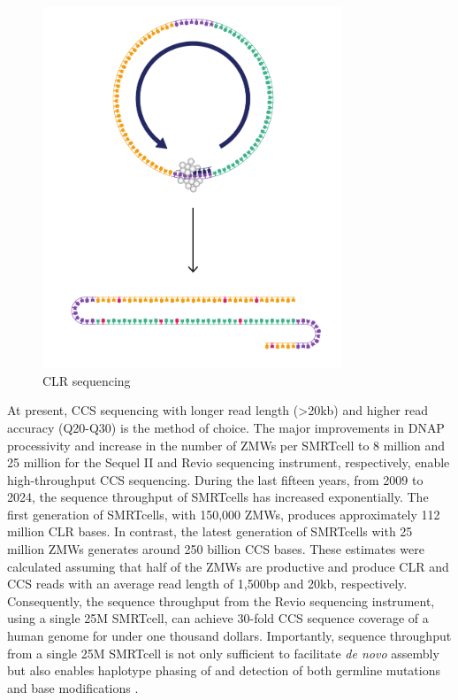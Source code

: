 \begin{figure}[h!]
\caption{CLR sequencing}
\label{figure:clr-sequencing}
\begin{centering}
\includegraphics[width=0.8\textwidth]{Vector/CLR_sequencing.pdf}
\end{centering}
\end{figure}

At present, CCS sequencing with longer read length (>20kb) and higher read accuracy (Q20-Q30) \cite{Wenger2019-pw} is the method of choice. The major improvements in DNAP processivity and increase in the number of ZMWs per SMRTcell to 8 million and 25 million for the Sequel II and Revio sequencing instrument, respectively, enable high-throughput CCS sequencing. During the last fifteen years, from 2009 to 2024, the sequence throughput of SMRTcells has increased exponentially. The first generation of SMRTcells, with 150,000 ZMWs, produces approximately 112 million CLR bases. In contrast, the latest generation of SMRTcells with 25 million ZMWs generates around 250 billion CCS bases. These estimates were calculated assuming that half of the ZMWs are productive and produce CLR and CCS reads with an average read length of 1,500bp and 20kb, respectively. Consequently, the sequence throughput from the Revio sequencing instrument, using a single 25M SMRTcell, can achieve 30-fold CCS sequence coverage of a human genome for under one thousand dollars. Importantly, sequence throughput from a single 25M SMRTcell is not only sufficient to facilitate \textit{de novo} assembly \cite{Nurk2020-gu, Cheng2021-ij} but also enables haplotype phasing of \cite{Patterson2015-an} and detection of both germline mutations \cite{Poplin2018-ub} and base modifications \cite{Tse2021-or}.

